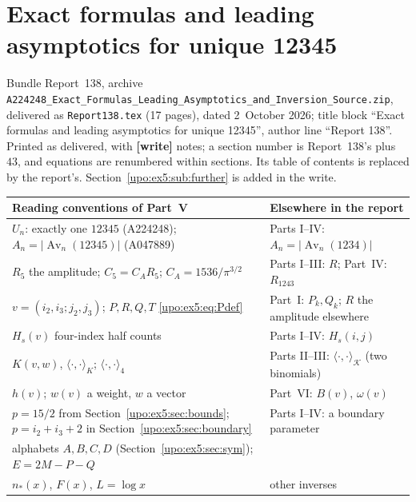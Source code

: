 \documentclass[11pt,letterpaper]{article}
\theoremstyle{remark}\newtheorem{remark}[theorem]{Remark}
\numberwithin{equation}{section}
\newcommand{\Av}{\operatorname{Av}}
\newcommand{\file}[1]{\nolinkurl{#1}}
\newcommand{\partsource}[1]{\par\noindent\begin{minipage}{\textwidth}\small #1\end{minipage}\par\medskip}
\begin{document}
\clearpage
\part{Exact formulas and leading asymptotics for unique 12345}\label{upo:ex5:part}
\partsource{Bundle Report~138, archive \file{A224248_Exact_Formulas_Leading_Asymptotics_and_Inversion_Source.zip}, delivered as \file{Report138.tex} (17 pages), dated 2~October 2026; title block ``Exact formulas and leading asymptotics for unique 12345'', author line ``Report 138''. Printed as delivered, with \textbf{[write]} notes; a section number is Report~138's plus~$43$, and equations are renumbered within sections. Its table of contents is replaced by the report's. Section~\ref{upo:ex5:sub:further} is added in the write.}
\begin{center}
\small
\begin{tabular}{@{}>{\raggedright\arraybackslash}p{} >{\raggedright\arraybackslash}p{}@{}}
\toprule
Reading conventions of Part~V & Elsewhere in the report\\
\midrule
$U_n$: exactly one $12345$ (A224248); $A_n=|\Av_n(12345)|$ (A047889) & Parts I--IV: $A_n=|\Av_n(1234)|$\\
$R_5$ the amplitude; $C_5=C_AR_5$; $C_A=1536/\pi^{3/2}$ & Parts I--III: $R$; Part~IV: $R_{1243}$\\
$v=(i_2,i_3;j_2,j_3)$; $P,R,Q,T$ \eqref{upo:ex5:eq:Pdef} & Part~I: $P_k,Q_k$; $R$ the amplitude elsewhere\\
$H_s(v)$ four-index half counts & Parts I--IV: $H_s(i,j)$\\
$K(v,w)$, $\langle\cdot,\cdot\rangle_K$; $\langle\cdot,\cdot\rangle_4$ & Parts II--III: $\langle\cdot,\cdot\rangle_{\mathcal K}$ (two binomials)\\
$h(v)$; $w(v)$ a weight, $w$ a vector & Part~VI: $B(v)$, $\omega(v)$\\
$p=15/2$ from Section~\ref{upo:ex5:sec:bounds}; $p=i_2+i_3+2$ in Section~\ref{upo:ex5:sec:boundary} & Parts I--IV: a boundary parameter\\
alphabets $A,B,C,D$ (Section~\ref{upo:ex5:sec:sym}); $E=2M-P-Q$ & \\
$n_*(x)$, $F(x)$, $L=\log x$ & other inverses\\
\bottomrule
\end{tabular}
\end{center}
\end{document}
